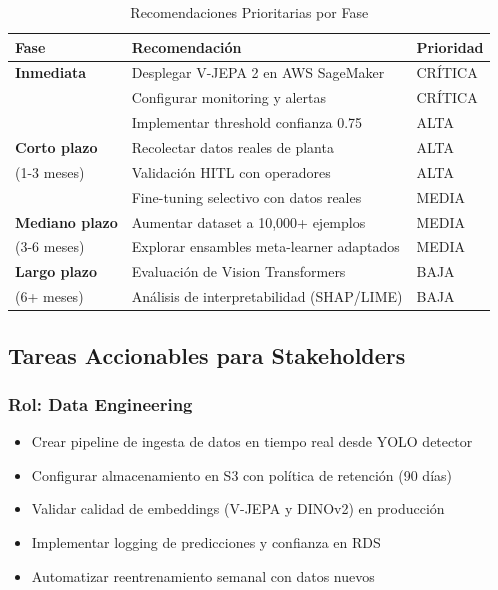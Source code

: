 \documentclass[11pt,letterpaper]{article}
\begin{document}
\begin{table}[H]
\centering
\caption{Recomendaciones Prioritarias por Fase}
\begin{tabular}{|l|p{4cm}|l|}
\hline
\textbf{Fase} & \textbf{Recomendación} & \textbf{Prioridad} \\
\hline
\textbf{Inmediata} & Desplegar V-JEPA 2 en AWS SageMaker & CRÍTICA \\
\hline
& Configurar monitoring y alertas & CRÍTICA \\
\hline
& Implementar threshold confianza 0.75 & ALTA \\
\hline
\textbf{Corto plazo} & Recolectar datos reales de planta & ALTA \\
(1-3 meses)
& Validación HITL con operadores & ALTA \\
\hline
& Fine-tuning selectivo con datos reales & MEDIA \\
\hline
\textbf{Mediano plazo} & Aumentar dataset a 10,000+ ejemplos & MEDIA \\
(3-6 meses)
& Explorar ensambles meta-learner adaptados & MEDIA \\
\hline
\textbf{Largo plazo} & Evaluación de Vision Transformers & BAJA \\
(6+ meses)
& Análisis de interpretabilidad (SHAP/LIME) & BAJA \\
\hline
\end{tabular}
\end{table}

\subsection{Tareas Accionables para Stakeholders}

\subsubsection{Rol: Data Engineering}

\begin{itemize}
  \item [*] Crear pipeline de ingesta de datos en tiempo real desde YOLO detector
  \item [*] Configurar almacenamiento en S3 con política de retención (90 días)
  \item [*] Validar calidad de embeddings (V-JEPA y DINOv2) en producción
  \item [*] Implementar logging de predicciones y confianza en RDS
  \item [*] Automatizar reentrenamiento semanal con datos nuevos
\end{itemize}
\end{document}
